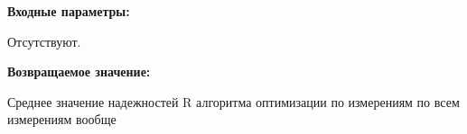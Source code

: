 \textbf{Входные параметры:}

Отсутствуют.

\textbf{Возвращаемое значение:}

Среднее значение надежностей R алгоритма оптимизации по измерениям по всем измерениям вообще